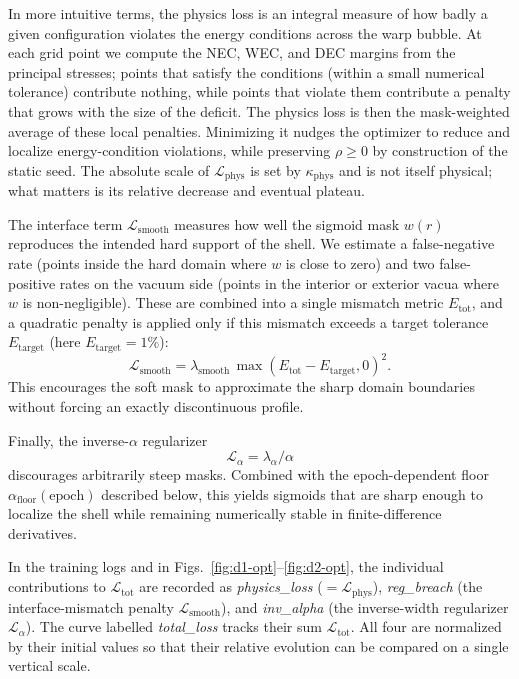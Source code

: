 \documentclass[11pt]{article}
\begin{document}
In more intuitive terms, the physics loss is an integral measure of how badly a given configuration violates the energy conditions across the warp bubble. At each grid point we compute the NEC, WEC, and DEC margins from the principal stresses; points that satisfy the conditions (within a small numerical tolerance) contribute nothing, while points that violate them contribute a penalty that grows with the size of the deficit. The physics loss is then the mask-weighted average of these local penalties. Minimizing it nudges the optimizer to reduce and localize energy-condition violations, while preserving $\rho\ge 0$ by construction of the static seed. The absolute scale of $\mathcal{L}_\text{phys}$ is set by $\kappa_\text{phys}$ and is not itself physical; what matters is its relative decrease and eventual plateau.

The interface term $\mathcal{L}_\text{smooth}$ measures how well the sigmoid mask $w(r)$ reproduces the intended hard support of the shell. We estimate a false-negative rate (points inside the hard domain where $w$ is close to zero) and two false-positive rates on the vacuum side (points in the interior or exterior vacua where $w$ is non-negligible). These are combined into a single mismatch metric $E_\text{tot}$, and a quadratic penalty is applied only if this mismatch exceeds a target tolerance $E_\text{target}$ (here $E_\text{target}=1\%$):
\begin{equation}
\mathcal{L}_\text{smooth} = \lambda_\text{smooth}\,\max(E_\text{tot} - E_\text{target},0)^2.
\end{equation}
This encourages the soft mask to approximate the sharp domain boundaries without forcing an exactly discontinuous profile.

Finally, the inverse-$\alpha$ regularizer
\begin{equation}
\mathcal{L}_\alpha = \lambda_\alpha/\alpha
\end{equation}
discourages arbitrarily steep masks. Combined with the epoch-dependent floor $\alpha_\text{floor}(\text{epoch})$ described below, this yields sigmoids that are sharp enough to localize the shell while remaining numerically stable in finite-difference derivatives.

In the training logs and in Figs.~\ref{fig:d1-opt}--\ref{fig:d2-opt}, the individual contributions to $\mathcal{L}_\text{tot}$ are recorded as \emph{physics\_loss} ($=\mathcal{L}_\text{phys}$), \emph{reg\_breach} (the interface-mismatch penalty $\mathcal{L}_\text{smooth}$), and \emph{inv\_alpha} (the inverse-width regularizer $\mathcal{L}_\alpha$). The curve labelled \emph{total\_loss} tracks their sum $\mathcal{L}_\text{tot}$. All four are normalized by their initial values so that their relative evolution can be compared on a single vertical scale.
\end{document}
